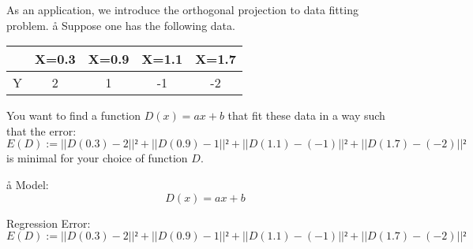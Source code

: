 
As an application, we introduce the orthogonal projection to data fitting problem.
\a\aa
\exe Suppose one has the following data. 
~\\
\begin{tabular}{|c|c|c|c|c|}
	\hline
	 &X=0.3&X=0.9&X=1.1&X=1.7   \\
	 \hline
	 Y&2&1&-1&-2\\
	\hline
\end{tabular}
    

You want to find a function $D(x)=ax+b$ that fit these data in a way such that the error:
$$
E(D):=||D(0.3)-2||² +
||D(0.9)-1||² +
||D(1.1)-(-1)||²+ 
||D(1.7)-(-2)||² 
$$
is minimal for your choice of function $D$.


\a\aa
Model: 
$$D(x) = ax+b$$

Regression Error:
$$
E(D):=||D(0.3)-2||² +
||D(0.9)-1||² +
||D(1.1)-(-1)||²+ 
||D(1.7)-(-2)||² 
$$


